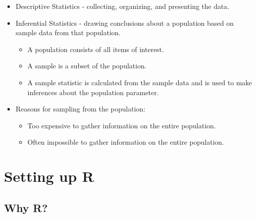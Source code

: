 \documentclass[
  letterpaper,
  DIV=11,
  numbers=noendperiod]{scrreprt}
\providecommand{\tightlist}{%
  \setlength{\itemsep}{0pt}\setlength{\parskip}{0pt}}\usepackage{longtable,booktabs,array}
\begin{document}
\begin{itemize}
\tightlist
\item
  Descriptive Statistics - collecting, organizing, and presenting the
  data.
\item
  Inferential Statistics - drawing conclusions about a population based
  on sample data from that population.

  \begin{itemize}
  \tightlist
  \item
    A population consists of all items of interest.
  \item
    A sample is a subset of the population.
  \item
    A sample statistic is calculated from the sample data and is used to
    make inferences about the population parameter.
  \end{itemize}
\item
  Reasons for sampling from the population:

  \begin{itemize}
  \tightlist
  \item
    Too expensive to gather information on the entire population.
  \item
    Often impossible to gather information on the entire population.
  \end{itemize}
\end{itemize}


\chapter{Setting up R}\label{setting-up-r}

\section{Why R?}\label{why-r}
\end{document}
